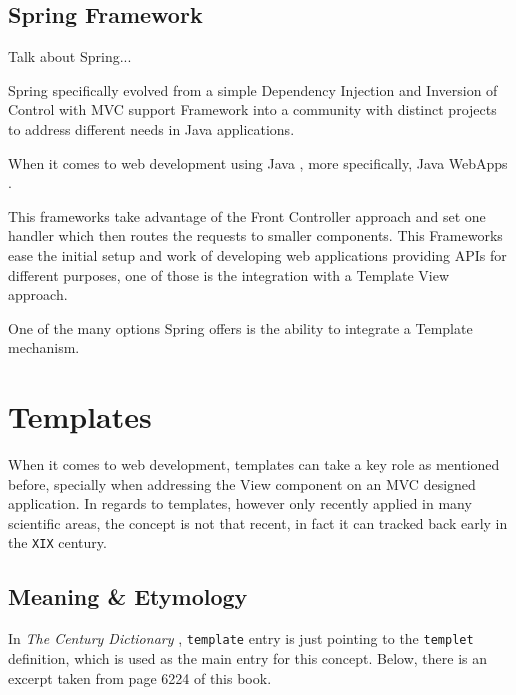 \subsection{Spring Framework}

\begin{expand}
    Talk about Spring...\cite{Johnson2005ProfessionalFramework}
    
    Spring specifically evolved from a simple Dependency Injection and Inversion of Control with MVC support Framework into a community with distinct projects to address different needs in Java applications.
\end{expand}

When it comes to web development using Java \cite{Bloch2008EffectiveSeries}, more specifically, Java WebApps \cite{Williams2014ProfessionalApplications}.

This frameworks take advantage of the Front Controller approach and set one handler which then routes the requests to smaller components. This Frameworks ease the initial setup and work of developing web applications providing APIs for different purposes, one of those is the integration with a Template View approach.

One of the many options Spring offers is the ability to integrate a Template mechanism.

\section{Templates}

When it comes to web development, templates can take a key role as mentioned before, specially when addressing the View component on an MVC designed application. In regards to templates, however only recently applied in many scientific areas, the concept is not that recent, in fact it can tracked back early in the \texttt{XIX} century.

\subsection{Meaning \& Etymology}

In \textit{The Century Dictionary} \cite[p.6224]{Whitney1906TheDictionary}, \texttt{template} entry is just pointing to the \texttt{templet} definition, which is used as the main entry for this concept. Below, there is an excerpt taken from page 6224 of this book.

